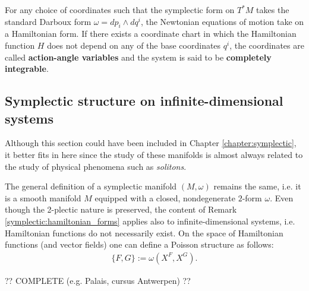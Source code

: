     For any choice of coordinates such that the symplectic form on $T^*M$ takes the standard Darboux form $\omega=dp_i\wedge dq^i$, the Newtonian equations of motion take on a Hamiltonian form. If there exists a coordinate chart in which the Hamiltonian function $H$ does not depend on any of the base coordinates $q^i$, the coordinates are called \textbf{action-angle variables} and the system is said to be \textbf{completely integrable}.

\subsection{Symplectic structure on infinite-dimensional systems}

    Although this section could have been included in Chapter \ref{chapter:symplectic}, it better fits in here since the study of these manifolds is almost always related to the study of physical phenomena such as \textit{solitons}.

    The general definition of a symplectic manifold $(M,\omega)$ remains the same, i.e. it is a smooth manifold $M$ equipped with a closed, nondegenerate $2$-form $\omega$. Even though the 2-plectic nature is preserved, the content of Remark \ref{symplectic:hamiltonian_forms} applies also to infinite-dimensional systems, i.e. Hamiltonian functions do not necessarily exist. On the space of Hamiltonian functions (and vector fields) one can define a Poisson structure as follows:
    \begin{gather}
        \{F,G\} := \omega(X^F,X^G).
    \end{gather}

    ?? COMPLETE (e.g. Palais, cursus Antwerpen) ??